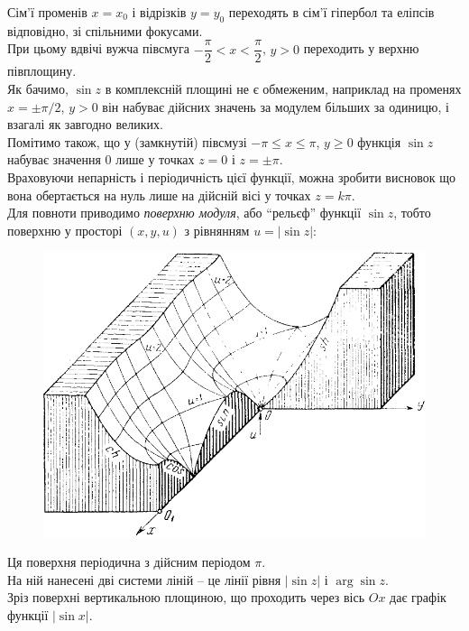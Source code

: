 Сім'ї променів $x = x_0$ і відрізків $y = y_0$ переходять в сім'ї гіпербол та еліпсів відповідно, зі спільними фокусами. \\

При цьому вдвічі вужча півсмуга $- \dfrac{\pi}{2} < x < \dfrac{\pi}{2}$, $y > 0$ переходить у верхню півплощину. \\

Як бачимо, $\sin z$ в комплексній площині не є обмеженим, наприклад на променях $x = \pm \pi/2$, $y > 0$ він набуває дійсних значень за модулем більших за одиницю, і взагалі як завгодно великих. \\

Помітимо також, що у (замкнутій) півсмузі $- \pi \le x \le \pi$, $y \ge 0$ функція $\sin z$ набуває значення 0 лише у точках $z = 0$ і $z = \pm \pi$. \\

Враховуючи непарність і періодичність цієї функції, можна зробити висновок що вона обертається на нуль лише на дійсній вісі у точках $z = k \pi$. \\

Для повноти приводимо \textit{поверхню модуля}, або ``рельєф'' функції $\sin z$, тобто поверхню у просторі $(x,y,u)$ з рівнянням $u=|\sin z|$:

\begin{figure}[H]
	\centering
	\includegraphics[width=.8\linewidth]{mal-16.png}
\end{figure}

Ця поверхня періодична з дійсним періодом $\pi$. \\

На ній нанесені дві системи ліній -- це лінії рівня $|\sin z|$ і $\arg \sin z$. \\

Зріз поверхні вертикальною площиною, що проходить через вісь $Ox$ дає графік функції $|\sin x|$. \\

